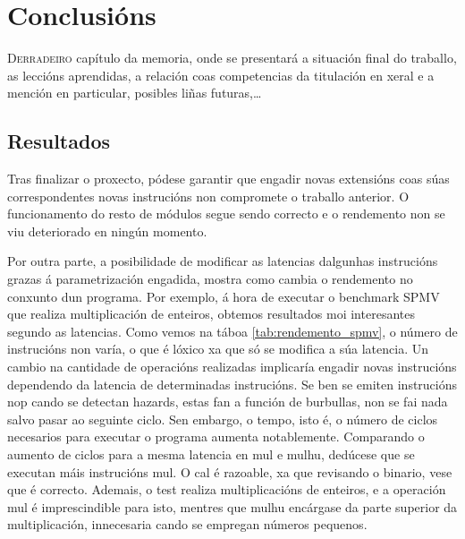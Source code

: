 \chapter{Conclusións}
\label{chap:conclusions}

\lettrine{D}{erradeiro} capítulo da memoria, onde se presentará a situación final do traballo, as leccións aprendidas, a relación coas competencias da titulación en xeral e a mención en particular, posibles liñas futuras,\dots

\section{Resultados}\label{chap:resultados}
Tras finalizar o proxecto, pódese garantir que engadir novas extensións coas súas correspondentes novas instrucións non compromete o traballo anterior. O funcionamento do resto de módulos segue sendo correcto e o rendemento non se viu deteriorado en ningún momento.

Por outra parte, a posibilidade de modificar as latencias dalgunhas instrucións grazas á parametrización engadida, mostra como cambia o rendemento no conxunto dun programa. Por exemplo, á hora de executar o benchmark SPMV que realiza multiplicación de enteiros, obtemos resultados moi interesantes segundo as latencias. Como vemos na táboa \ref{tab:rendemento_spmv}, o número de instrucións non varía, o que é lóxico xa que só se modifica a súa latencia. Un cambio na cantidade de operacións realizadas implicaría engadir novas instrucións dependendo da latencia de determinadas instrucións. Se ben se emiten instrucións \acrshort{nop} cando se detectan hazards, estas fan a función de burbullas, non se fai nada salvo pasar ao seguinte ciclo. Sen embargo, o tempo, isto é, o número de ciclos necesarios para executar o programa aumenta notablemente. Comparando o aumento de ciclos para a mesma latencia en mul e mulhu, dedúcese que se executan máis instrucións mul. O cal é razoable, xa que revisando o binario, vese que é correcto. Ademais, o test realiza multiplicacións de enteiros, e a operación mul é imprescindible para isto, mentres que mulhu encárgase da parte superior da multiplicación, innecesaria cando se empregan números pequenos.


